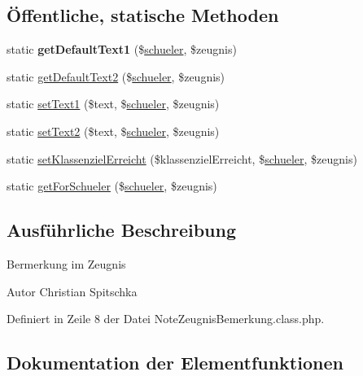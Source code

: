 \subsection*{Öffentliche, statische Methoden}
\begin{DoxyCompactItemize}
\item 
\mbox{\label{class_note_zeugnis_bemerkung_ac8811192d93bc5f7924116941b4e876b}} 
static {\bfseries get\+Default\+Text1} (\$\mbox{\hyperlink{classschueler}{schueler}}, \$zeugnis)
\item 
static \mbox{\hyperlink{class_note_zeugnis_bemerkung_a5facec8fa0e9d44d73b9a4ba66e4d4a5}{get\+Default\+Text2}} (\$\mbox{\hyperlink{classschueler}{schueler}}, \$zeugnis)
\item 
static \mbox{\hyperlink{class_note_zeugnis_bemerkung_a3a4b256297070ee150cf8ba800d19d50}{set\+Text1}} (\$text, \$\mbox{\hyperlink{classschueler}{schueler}}, \$zeugnis)
\item 
static \mbox{\hyperlink{class_note_zeugnis_bemerkung_a0c75a20d4733d93514dd2f0cba08fa22}{set\+Text2}} (\$text, \$\mbox{\hyperlink{classschueler}{schueler}}, \$zeugnis)
\item 
static \mbox{\hyperlink{class_note_zeugnis_bemerkung_a754959ef5248ea565d18a59cc54f2d62}{set\+Klassenziel\+Erreicht}} (\$klassenziel\+Erreicht, \$\mbox{\hyperlink{classschueler}{schueler}}, \$zeugnis)
\item 
static \mbox{\hyperlink{class_note_zeugnis_bemerkung_a66aa6f6e087a54c7b4e8e911cc158d50}{get\+For\+Schueler}} (\$\mbox{\hyperlink{classschueler}{schueler}}, \$zeugnis)
\end{DoxyCompactItemize}


\subsection{Ausführliche Beschreibung}
Bermerkung im Zeugnis \begin{DoxyAuthor}{Autor}
Christian Spitschka 
\end{DoxyAuthor}


Definiert in Zeile 8 der Datei Note\+Zeugnis\+Bemerkung.\+class.\+php.



\subsection{Dokumentation der Elementfunktionen}
\mbox{\label{class_note_zeugnis_bemerkung_a5facec8fa0e9d44d73b9a4ba66e4d4a5}} 
